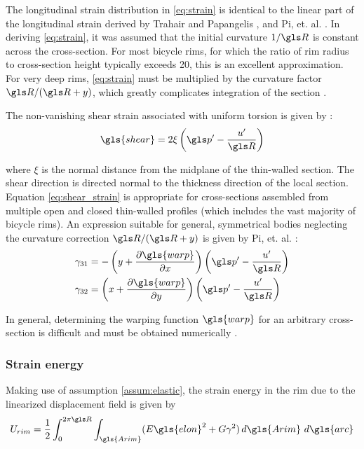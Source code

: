 \documentclass[\rootdir/thesis.tex]{subfiles}
\begin{document}
The longitudinal strain distribution in \eqref{eq:strain} is identical to the linear part of the longitudinal strain derived by Trahair and Papangelis \cite{Trahair1987}, and Pi, et. al. \cite{Pi1995}. In deriving \eqref{eq:strain}, it was assumed that the initial curvature $1/\R$ is constant across the cross-section. For most bicycle rims, for which the ratio of rim radius to cross-section height typically exceeds 20, this is an excellent approximation. For very deep rims, \eqref{eq:strain} must be multiplied by the curvature factor $\R/(\R+\y)$, which greatly complicates integration of the section \cite{Kang1994,Lim2004,Ryu2012}.

The non-vanishing shear strain associated with uniform torsion is given by \cite{Pi1995,Kang1994}:
\begin{equation}
\label{eq:shear_strain}
\gls{shear} = 2 \xi \left(\p' - \frac{u'}{\R}\right)
\end{equation}

where $\xi$ is the normal distance from the midplane of the thin-walled section. The shear direction is directed normal to the thickness direction of the local section. Equation \eqref{eq:shear_strain} is appropriate for cross-sections assembled from multiple open and closed thin-walled profiles (which includes the vast majority of bicycle rims). An expression suitable for general, symmetrical bodies neglecting the curvature correction $\R/(\R+\y)$ is given by Pi, et. al. \cite{Bradford2006b}:
\begin{subequations}
\begin{align}
\gamma_{31} &= -\left(\y + \frac{\partial \gls{warp}}{\partial \x}\right)\left(\p' - \frac{u'}{\R}\right)\\
\gamma_{32} &= \left(\x + \frac{\partial \gls{warp}}{\partial \y}\right)\left(\p' - \frac{u'}{\R}\right)
\end{align}
\end{subequations}

In general, determining the warping function $\gls{warp}$ for an arbitrary cross-section is difficult and must be obtained numerically \cite{Timoshenko1961}.


\subsubsection{Strain energy}
Making use of assumption \ref{assum:elastic}, the strain energy in the rim due to the linearized displacement field is given by
\begin{equation}
\label{eq:U_rim_gen}
U_{rim} = \frac{1}{2}\int_0^{2\pi \R} \int_{\gls{Arim}} (\E\gls{elon}^2 + \G\gamma^2) \,d\gls{Arim}\,\, d\gls{arc}
\end{equation}
\end{document}
